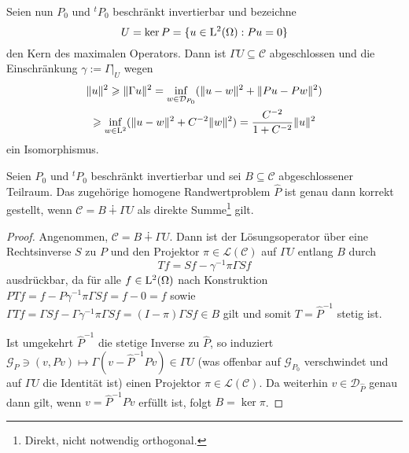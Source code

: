 Seien nun $P_0$ und ${}^t P_0$ beschränkt invertierbar und bezeichne 
\begin{equation}
  U=\ker P = \{u\in\mathrm L^2(\Omega) : Pu =0\}
\end{equation}  
den Kern des maximalen Operators. Dann ist $\Gamma U\subseteq \mathcal C$ abgeschlossen und die Einschränkung $\gamma:=\Gamma|_U$ wegen
\begin{multline}
  \|u\|^2\geqslant \|\Gamma u\|^2 = \inf_{w\in \mathcal D_{P_0}} (\|u-w\|^2 + \|Pu - Pw\|^2) \\   \geqslant \inf_{w\in \mathrm L^2} (\|u-w\|^2 + C^{-2} \|w\|^2) = \frac{C^{-2}}{1+C^{-2}}\|u\|^2
\end{multline}
ein Isomorphismus. 
\begin{thm}
Seien $P_0$ und ${}^t P_0$ beschränkt invertierbar und sei $B\subseteq\mathcal C$ abgeschlossener Teilraum. Das zugehörige homogene Randwertproblem $\widehat P$ ist genau dann korrekt gestellt, wenn $\mathcal C = B \dotplus \Gamma U $ als direkte Summe\footnote{Direkt, nicht notwendig orthogonal.} gilt.
\end{thm}
\begin{proof}
Angenommen, $\mathcal C = B \dotplus \Gamma U$. Dann ist der Lösungsoperator über eine Rechtsinverse $S$ zu $P$ und den Projektor $\pi\in\mathcal L(\mathcal C)$ auf  $\Gamma U$ entlang $B$ durch
\begin{equation}
     Tf = Sf-\gamma^{-1}\pi\Gamma Sf
\end{equation}
ausdrückbar, da für alle $f\in\mathrm L^2(\Omega)$ nach Konstruktion $PTf=f-P \gamma^{-1}\pi\Gamma S f=f-0=f$ sowie $\Gamma T f=\Gamma Sf - \Gamma\gamma^{-1}\pi \Gamma Sf=(I-\pi)\Gamma Sf\in B$ gilt und somit $T=\widehat P^{-1}$ stetig ist.  

Ist umgekehrt $\widehat P^{-1}$ die stetige Inverse zu $\widehat P$, so induziert
$\mathcal G_P\ni(v,Pv) \mapsto \Gamma(v-\widehat P^{-1}Pv)\in\Gamma U$ (was offenbar auf $\mathcal G_{P_0}$ verschwindet und auf $\Gamma U$ die Identität ist) einen Projektor $\pi\in\mathcal L(\mathcal C)$. Da weiterhin $v\in\mathcal D_{\widehat P}$ genau dann gilt, wenn $v=\widehat P^{-1}Pv$ erfüllt ist, folgt $B=\ker\pi$.
\end{proof}

